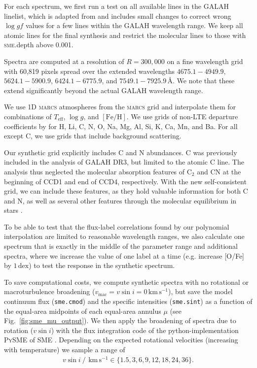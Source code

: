 \documentclass[
  journal=pasa,
  manuscript=research-paper, %
  year=2023,
  volume=37
]{cup-journal}
\newcommand{\Teff}{$T_\mathrm{eff}$\xspace}
\newcommand{\logg}{$\log g$\xspace}
\newcommand{\feh}{$\mathrm{[Fe/H]}$\xspace}
\newcommand{\vsini}{$v \sin i$\xspace}
\newcommand{\marcs}{\textsc{marcs}\xspace}
\newcommand{\dex}{\,\mathrm{dex}}	%
\newcommand{\Angstroem}{\,\text{\AA}}	%
\newcommand{\kms}{\,\mathrm{km\,s^{-1}}}	%
\begin{document}
For each spectrum, we first run a test on all available lines in the GALAH linelist, which is adapted from \citet{Heiter2021} and includes small changes to correct wrong $\log gf$ values for a few lines within the GALAH wavelength range. We keep all atomic lines for the final synthesis and restrict the molecular lines to those with \textsc{sme}.depth above 0.001.

Spectra are computed at a resolution of $R = 300,000$ on a fine wavelength grid with 60,819 pixels spread over the extended wavelengths $4675.1-4949.9$, $5624.1-5900.9$, $6424.1-6775.9$, and $7549.1-7925.9 \Angstroem$. We note that these extend significantly beyond the actual GALAH wavelength range.

We use 1D \marcs atmospheres from the \marcs grid \citep[][version 2014]{Gustafsson2008} and interpolate them for combinations of \Teff, \logg, and \feh. We use grids of non-LTE departure coefficients by \citet{Amarsi2020} for H, Li, C, N, O, Na, Mg, Al, Si, K, Ca, Mn, and Ba. For all except C, we use grids that include background scattering.

Our synthetic grid explicitly includes C and N abundances. C was previously included in the analysis of GALAH DR3, but limited to the atomic C line. The analysis thus neglected the molecular absorption features of $\mathrm{C_2}$ and CN at the beginning of CCD1 and end of CCD4, respectively. With the new self-consistent grid, we can include these features, as they hold valuable information for both C and N, as well as several other features through the molecular equilibrium in stars \citep[see e.g.][]{Ting2018}.

To be able to test that the flux-label correlations found by our polynomial interpolation are limited to reasonable wavelength ranges, we also calculate one spectrum that is exactly in the middle of the parameter range and additional spectra, where we increase the value of one label at a time (e.g. increase [O/Fe] by $1\dex$) to test the response in the synthetic spectrum.

To save computational costs, we compute synthetic spectra with no rotational or macroturbulence broadening ($v_\text{mac} = v\sin i = 0\kms$), but save the model continuum flux (\texttt{sme.cmod}) and the specific intensities (\texttt{sme.sint}) as a function of the equal-area midpoints of each equal-area annulus $\mu$ (see Fig.~\ref{fig:sme_mu_output}). We then apply the broadening of spectra due to rotation (\vsini) with the flux integration code of the python-implementation \textsc{PySME} \citep{Wehrhahn2021} of \textsc{SME} \citep{Piskunov2017}. Depending on the expected rotational velocities (increasing with temperature) we sample a range of
\begin{align} \label{eq:vsini}
    v \sin i~/~\kms \in \{ 1.5, 3, 6, 9, 12, 18, 24, 36\}.
\end{align}
\end{document}
